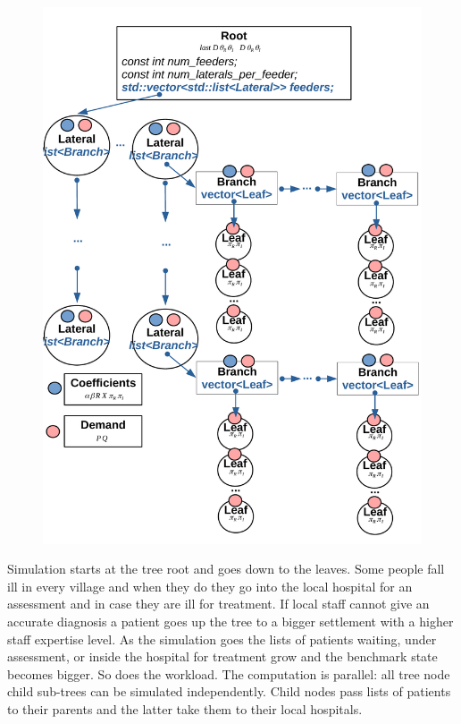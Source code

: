 \begin{figure}
\begin{minipage}{.5\textwidth}
  \centering
  \includegraphics[width=0.9\linewidth]{images/power_scheme.pdf}
  \label{fig:power_benchmark}
\end{minipage}
\end{figure}\newline\null
\quad Simulation starts at the tree root and goes down to the leaves. Some people fall ill in every village and when they do they go into the local hospital for an assessment and in case they are ill for treatment. If local staff cannot give an accurate diagnosis a patient goes up the tree to a bigger settlement with a higher staff expertise level. As the simulation goes the lists of patients waiting, under assessment, or inside the hospital for treatment grow and the benchmark state becomes bigger. So does the workload. The computation is parallel: all tree node child sub-trees can be simulated independently. Child nodes pass lists of patients to their parents and the latter take them to their local hospitals.\newline\null     
